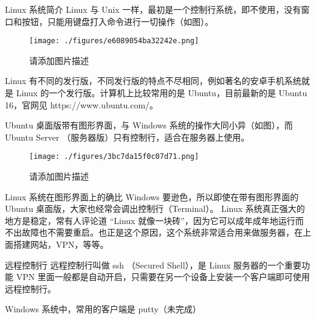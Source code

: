 
\begin{issues}
\issueDraft
\end{issues}

Linux 系统简介
Linux 与 Unix 一样，最初是一个控制行系统，即不使用，没有窗口和按钮，只能用键盘打入命令进行一切操作（如图）。

\begin{figure}[ht]
\centering
\texttt{[image: ./figures/e6089054ba32242e.png]}
\caption{请添加图片描述} \label{fig_Linux0_1}
\end{figure}

Linux 有不同的发行版，不同发行版的特点不尽相同，例如著名的安卓手机系统就是 Linux 的一个发行版。计算机上比较常用的是 Ubuntu，目前最新的是 Ubuntu 16，官网见 https://www.ubuntu.com/。

Ubuntu 桌面版带有图形界面，与 Windows 系统的操作大同小异（如图），而 Ubuntu Server （服务器版）只有控制行，适合在服务器上使用。

\begin{figure}[ht]
\centering
\texttt{[image: ./figures/3bc7da15f0c07d71.png]}
\caption{请添加图片描述} \label{fig_Linux0_2}
\end{figure}

Linux 系统在图形界面上的确比 Windows 要逊色，所以即使在带有图形界面的 Ubuntu 桌面版，大家也经常会调出控制行（Terminal）。 Linux 系统真正强大的地方是稳定，常有人评论道 “Linux 就像一块砖”，因为它可以成年成年地运行而不出故障也不需要重启。也正是这个原因，这个系统非常适合用来做服务器，在上面搭建网站，VPN，等等。

远程控制行
远程控制行叫做 ssh （Secured Shell），是 Linux 服务器的一个重要功能 VPN 里面一般都是自动开启，只需要在另一个设备上安装一个客户端即可使用远程控制行。

Windows 系统中，常用的客户端是 putty（未完成）
